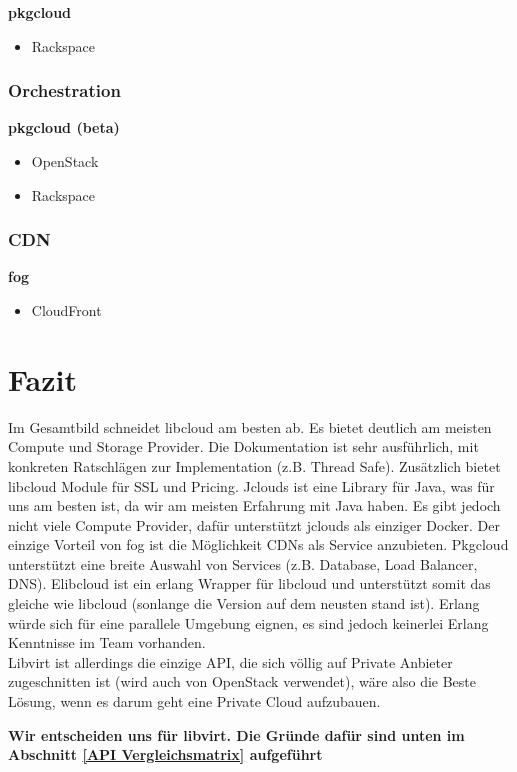 \textbf{pkgcloud}
\begin{itemize}
\item Rackspace
\end{itemize}

\subsubsection{Orchestration}
\textbf{pkgcloud (beta)}
\begin{itemize}
\item OpenStack
\item Rackspace
\end{itemize}

\subsubsection{CDN}
\textbf{fog}
\begin{itemize}
\item CloudFront
\end{itemize}

\newpage

\section{Fazit}

Im Gesamtbild schneidet libcloud am besten ab. Es bietet deutlich am meisten Compute und 
Storage Provider. Die Dokumentation ist sehr ausführlich, mit konkreten Ratschlägen zur 
Implementation (z.B. Thread Safe). Zusätzlich bietet libcloud Module für SSL und Pricing.
Jclouds ist eine Library für Java, was für uns am besten ist, da wir am meisten Erfahrung mit 
Java haben. Es gibt jedoch nicht viele Compute Provider, dafür unterstützt jclouds als einziger Docker.
Der einzige Vorteil von fog ist die Möglichkeit CDNs als Service anzubieten.
Pkgcloud unterstützt eine breite Auswahl von Services (z.B. Database, Load Balancer, DNS).
Elibcloud ist ein erlang Wrapper für libcloud und unterstützt somit das gleiche wie libcloud 
(sonlange die Version auf dem neusten stand ist). Erlang würde sich für eine parallele Umgebung eignen, 
es sind jedoch keinerlei Erlang Kenntnisse im Team vorhanden.\\
Libvirt ist allerdings die einzige API, die sich völlig auf Private Anbieter 
zugeschnitten ist (wird auch von OpenStack verwendet), wäre also die Beste 
Lösung, wenn es darum geht eine Private Cloud aufzubauen.

\textbf{Wir entscheiden uns für libvirt. Die Gründe dafür sind unten im Abschnitt \ref{API Vergleichsmatrix} aufgeführt}


